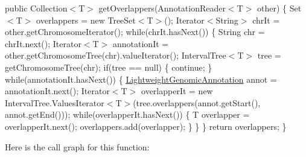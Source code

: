 public Collection$<$\+T$>$ get\+Overlappers(\+Annotation\+Reader$<$\+T$>$ other) \{ Set$<$\+T$>$ overlappers = new Tree\+Set$<$\+T$>$(); Iterator$<$\+String$>$ chr\+It = other.\+get\+Chromosome\+Iterator(); while(chr\+It.\+has\+Next()) \{ String chr = chr\+It.\+next(); Iterator$<$\+T$>$ annotation\+It = other.\+get\+Chromosome\+Tree(chr).value\+Iterator(); Interval\+Tree$<$\+T$>$ tree = get\+Chromosome\+Tree(chr); if(tree == null) \{ continue; \} while(annotation\+It.\+has\+Next()) \{ \hyperlink{interfacebroad_1_1core_1_1annotation_1_1_lightweight_genomic_annotation}{Lightweight\+Genomic\+Annotation} annot = annotation\+It.\+next(); Iterator$<$\+T$>$ overlapper\+It = new Interval\+Tree.\+Values\+Iterator$<$\+T$>$(tree.\+overlappers(annot.\+get\+Start(), annot.\+get\+End())); while(overlapper\+It.\+has\+Next()) \{ T overlapper = overlapper\+It.\+next(); overlappers.\+add(overlapper); \} \} \} return overlappers; \} 

Here is the call graph for this function\+:


